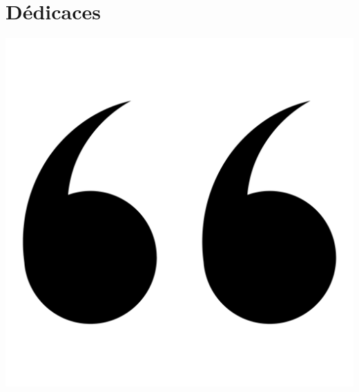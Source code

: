 \chapter*{Dédicaces}



\newcommand{\dedicationquote}[1]{%
    \begin{quote}
    \begin{center}
        \large\itshape\color{dedicationquote}
        #1
    \end{center}
    \end{quote}
}


\newcommand{\signature}[1]{%
    \begin{flushright}
        \color{signature}
        \emph{#1}
    \end{flushright}
}
\vspace{1cm}
\hspace{0.4cm}
\includegraphics[scale=0.02]{Logos/quote2.png}
\hspace{5cm}
    
